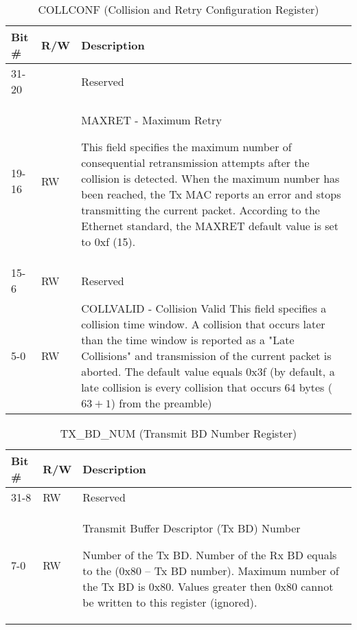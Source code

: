 \begin{table}[H]
  \centering
  \begin{tabularx}{\textwidth}{|l|l|X|}
    
    \hline
    \rowcolor{iob-green}
    {\bf Bit \#} & {\bf R/W} & {\bf Description} \\ \hline

    31-20   &   & Reserved \\ \hline
    \rowcolor{iob-blue}
    19-16      & RW & MAXRET - Maximum Retry

                This field specifies the maximum number of consequential
                retransmission attempts after the collision is detected. When
                the maximum number has been reached, the Tx MAC reports an
                error and stops transmitting the current packet. According to
                the Ethernet standard, the MAXRET default value is set to 0xf
                (15).\\ \hline
    15-6      & RW &   Reserved \\ \hline
    \rowcolor{iob-blue}
    5-0       & RW &   COLLVALID - Collision Valid 
%
                This field specifies a collision time window. A collision that
                occurs later than the time window is reported as a "Late
                Collisions" and transmission of the current packet is aborted.
                The default value equals 0x3f (by default, a late collision is
                every collision that occurs 64 bytes ($63 + 1$) from the
                preamble) \\ \hline
  \end{tabularx}
    \caption{COLLCONF (Collision and Retry Configuration Register)}
  \label{swreg_details:collconf}
\end{table}

\begin{table}[H]
  \centering
  \begin{tabularx}{\textwidth}{|l|l|X|}
    
    \hline
    \rowcolor{iob-green}
    {\bf Bit \#} & {\bf R/W} & {\bf Description} \\ \hline

    31-8   & RW  & Reserved \\ \hline
    \rowcolor{iob-blue}
      7-0   & RW  & Transmit Buffer Descriptor (Tx BD) Number

                Number of the Tx BD. Number of the Rx BD equals to the (0x80 –
                Tx BD number). Maximum number of the Tx BD is 0x80. Values
                greater then 0x80 cannot be written to this register
                (ignored).\\ \hline
  \end{tabularx}
    \caption{TX\_BD\_NUM (Transmit BD Number Register)}
  \label{swreg_details:tx_bd_num}
\end{table}

